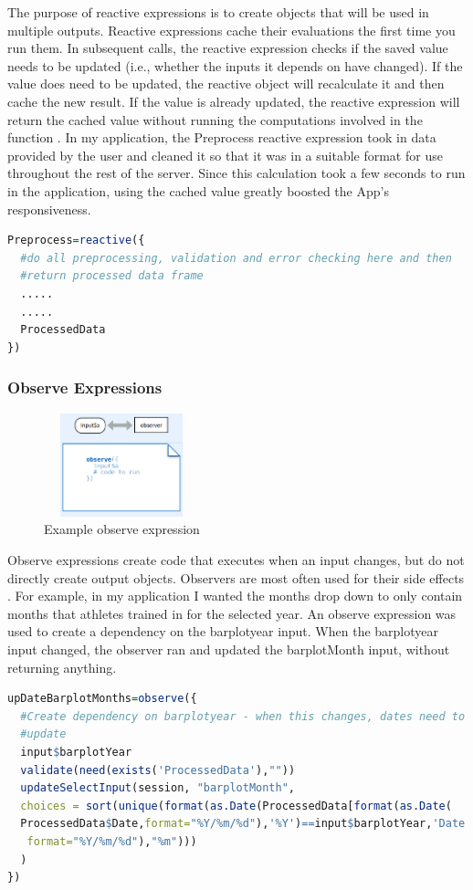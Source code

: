 The purpose of reactive expressions is to create objects that will be used in multiple outputs. Reactive expressions cache their evaluations the first time you run them. In subsequent calls, the reactive expression checks if the saved value needs to be updated (i.e., whether the inputs it depends on have changed). If the value does need to be updated, the reactive object will recalculate it and then cache the new result. If the value is already updated, the reactive expression will return the cached value without running the computations involved in the function \cite{shinyCheatSheet}. In my application, the Preprocess reactive expression took in data provided by the user and cleaned it so that it was in a suitable format for use throughout the rest of the server. Since this calculation took a few seconds to run in the application, using the cached value greatly boosted the App's responsiveness.
\begin{lstlisting}[language=R, basicstyle=\small]
Preprocess=reactive({
  #do all preprocessing, validation and error checking here and then
  #return processed data frame
  .....
  .....
  ProcessedData
})

\end{lstlisting}

\subsubsection{Observe Expressions}
\begin{figure}
	\vspace{-2.5em}
	\caption{Example observe expression \cite{shinyCheatSheet}}\label{wrap-fig:2}
	\includegraphics[height=3cm, width=4.5cm]{Images/ObserveExample.png}
\end{figure} 

Observe expressions create code that executes when an input changes, but do not directly create output objects. Observers are most often used for their side effects \cite{shinyCheatSheet}. For example, in my application I wanted the months drop down to only contain months that athletes trained in for the selected year. An observe expression was used to create a dependency on the barplotyear input. When the barplotyear input changed, the observer ran and updated the barplotMonth input, without returning anything.
\begin{lstlisting}[language=R, basicstyle=\small]
upDateBarplotMonths=observe({
  #Create dependency on barplotyear - when this changes, dates need to
  #update
  input$barplotYear
  validate(need(exists('ProcessedData'),""))
  updateSelectInput(session, "barplotMonth", 
  choices = sort(unique(format(as.Date(ProcessedData[format(as.Date(
  ProcessedData$Date,format="%Y/%m/%d"),'%Y')==input$barplotYear,'Date'],
   format="%Y/%m/%d"),"%m")))
  )
})
\end{lstlisting}
\newpage
